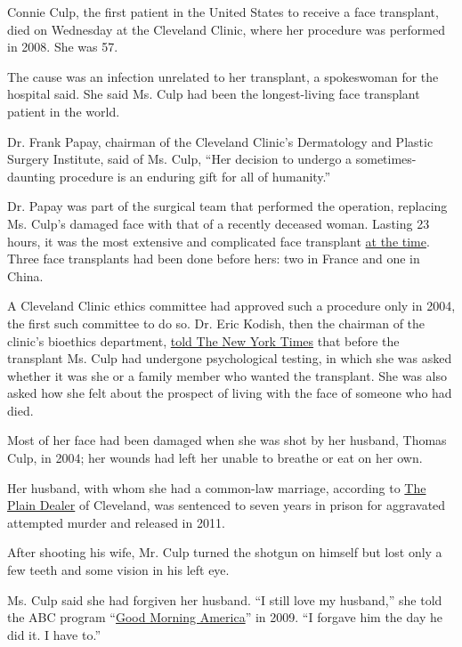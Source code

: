 Connie Culp, the first patient in the United States to receive a face
transplant, died on Wednesday at the Cleveland Clinic, where her
procedure was performed in 2008. She was 57.

The cause was an infection unrelated to her transplant, a spokeswoman
for the hospital said. She said Ms. Culp had been the longest-living
face transplant patient in the world.

Dr. Frank Papay, chairman of the Cleveland Clinic's Dermatology and
Plastic Surgery Institute, said of Ms. Culp, ``Her decision to undergo a
sometimes-daunting procedure is an enduring gift for all of humanity.''

Dr. Papay was part of the surgical team that performed the operation,
replacing Ms. Culp's damaged face with that of a recently deceased
woman. Lasting 23 hours, it was the most extensive and complicated face
transplant
\href{https://www.nytimes.com/2008/12/17/health/17face.html}{at the
time}. Three face transplants had been done before hers: two in France
and one in China.

A Cleveland Clinic ethics committee had approved such a procedure only
in 2004, the first such committee to do so. Dr. Eric Kodish, then the
chairman of the clinic's bioethics department,
\href{https://www.nytimes.com/2008/12/18/health/s18face.html}{told The
New York Times} that before the transplant Ms. Culp had undergone
psychological testing, in which she was asked whether it was she or a
family member who wanted the transplant. She was also asked how she felt
about the prospect of living with the face of someone who had died.

Most of her face had been damaged when she was shot by her husband,
Thomas Culp, in 2004; her wounds had left her unable to breathe or eat
on her own.

Her husband, with whom she had a common-law marriage, according to
\href{https://www.cleveland.com/healthfit/2010/11/woman_who_underwent_first_near.html}{The
Plain Dealer} of Cleveland, was sentenced to seven years in prison for
aggravated attempted murder and released in 2011.

After shooting his wife, Mr. Culp turned the shotgun on himself but lost
only a few teeth and some vision in his left eye.

Ms. Culp said she had forgiven her husband. ``I still love my husband,''
she told the ABC program
``\href{https://abcnews.go.com/Health/MindMoodNews/story?id=7535591}{Good
Morning America}'' in 2009. ``I forgave him the day he did it. I have
to.''


